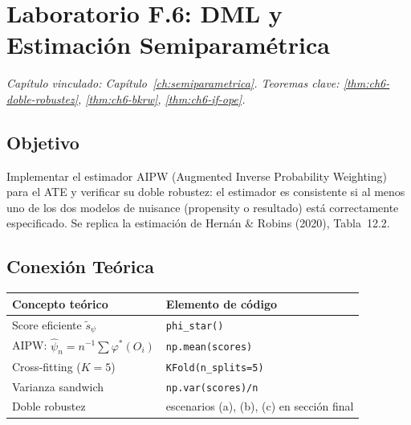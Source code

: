 \section{Laboratorio F.6: DML y Estimación Semiparamétrica}
\label{lab:F6}
\textit{Capítulo vinculado: Capítulo~\ref{ch:semiparametrica}.
Teoremas clave: \ref{thm:ch6-doble-robustez}, \ref{thm:ch6-bkrw},
\ref{thm:ch6-if-ope}.}

\bigskip

\subsection*{Objetivo}

Implementar el estimador AIPW (Augmented Inverse Probability Weighting) para
el ATE y verificar su doble robustez: el estimador es consistente si al menos
uno de los dos modelos de nuisance (propensity o resultado) está correctamente
especificado. Se replica la estimación de Hernán \& Robins (2020), Tabla~12.2.

\subsection*{Conexión Teórica}

\begin{center}
\small
\begin{tabular}{ll}
\toprule
\textbf{Concepto teórico} & \textbf{Elemento de código} \\
\midrule
Score eficiente $\tilde{s}_\psi$ & \texttt{phi\_star()} \\
AIPW: $\hat\psi_n = n^{-1}\sum\varphi^*(O_i)$ & \texttt{np.mean(scores)} \\
Cross-fitting ($K=5$) & \texttt{KFold(n\_splits=5)} \\
Varianza sandwich & \texttt{np.var(scores)/n} \\
Doble robustez & escenarios (a), (b), (c) en sección final \\
\bottomrule
\end{tabular}
\end{center}

